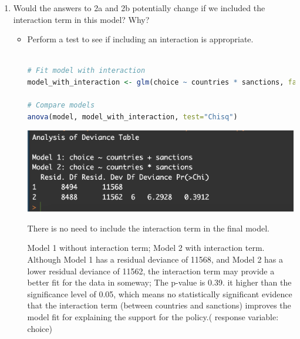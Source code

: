 \documentclass[12pt,letterpaper]{article}
\begin{document}
\begin{enumerate}
\begin{enumerate}
\begin{lstlisting}[language=R]
# proportional to the number of countries 
L_value <- 80 / 192
Q_value <- L_value^2

log_odds = intercept + (coef_L * L_value) + (coef_Q * Q_value)

# Convert log-odds to probability
probability = exp(log_odds) / (1 + exp(log_odds))
print(probability)
#0.5457787
\end{lstlisting} 
Using the coefficients from the part 1 logistic regression model, sanctions are at 0;  calculation base on L represents a direct scaling of the number of countries, Q represents the square of the linear term 		
\item
		Would the answers to 2a and 2b potentially change if we included the interaction term in this model? Why? 
		\begin{itemize}
			\item Perform a test to see if including an interaction is appropriate.
\begin{lstlisting}[language=R] 

# Fit model with interaction
model_with_interaction <- glm(choice ~ countries * sanctions, family=binomial(link="logit"), data=climateSupport)

# Compare models
anova(model, model_with_interaction, test="Chisq")

\end{lstlisting} 
 \includegraphics[width=12cm]{Screenshot 2024-02-12 at 20.36.25.png}

 There is no need to include the interaction term in the final model.
 
 Model 1 without interaction term; Model 2 with interaction term. Although Model 1 has a residual deviance of 11568, and Model 2 has a lower residual deviance of 11562, the interaction term may provide a better fit for the data in someway;  The p-value is 0.39. it higher than the significance level of 0.05, which means no statistically significant evidence that the interaction term (between countries and sanctions) improves the model fit for explaining the support for the policy.( response variable: choice)
 
 \end{itemize}
	\end{enumerate}
	\end{enumerate}
\end{document}
